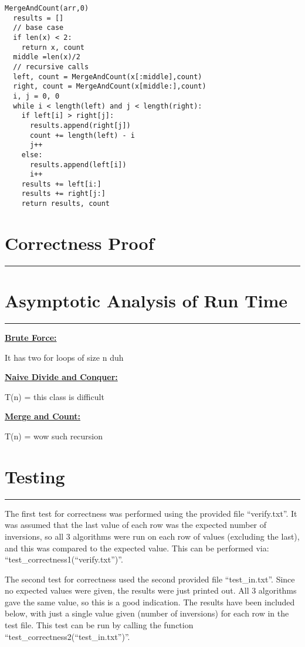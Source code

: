 \documentclass[letterpaper,10pt,titlepage,fleqn]{article}
\begin{document}
\begin{lstlisting}
MergeAndCount(arr,0)
  results = []
  // base case
  if len(x) < 2:
    return x, count
  middle =len(x)/2
  // recursive calls
  left, count = MergeAndCount(x[:middle],count)
  right, count = MergeAndCount(x[middle:],count)
  i, j = 0, 0
  while i < length(left) and j < length(right):
    if left[i] > right[j]:
      results.append(right[j])
      count += length(left) - i
      j++
    else:
      results.append(left[i])
      i++
    results += left[i:]
    results += right[j:]
    return results, count
\end{lstlisting}

\section*{Correctness Proof}
\hrule

\section*{Asymptotic Analysis of Run Time}
\hrule
\begin{centering}
\underline{\large{\textbf{Brute Force:}}}\\
\end{centering}
It has two for loops of size n duh

\begin{centering}
\underline{\large{\textbf{Naive Divide and Conquer:}}}\\
\end{centering}
T(n) = this class is difficult

\begin{centering}
\underline{\large{\textbf{Merge and Count:}}}\\
\end{centering}
T(n) = wow such recursion


\section*{Testing}
\hrule
The first test for correctness was performed using the provided file ``verify.txt''. It was assumed that the last value of each row was the expected number of inversions, so all 3 algorithms were run on each row of values (excluding the last), and this was compared to the expected value. This can be performed via: ``test\_correctness1(``verify.txt'')''.

The second test for correctness used the second provided file ``test\_in.txt''. Since no expected values were given, the results were just printed out. All 3 algorithms gave the same value, so this is a good indication. The results have been included below, with just a single value given (number of inversions) for each row in the test file. This test can be run by calling the function ``test\_correctness2(``test\_in.txt'')''.
\end{document}
